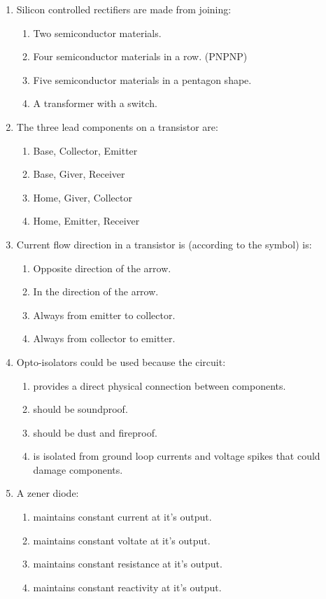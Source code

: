\documentclass[10pt]{article}
\begin{document}
\begin{multicols}{2}
\begin{enumerate}
\begin{enumerate}
	\end{enumerate}
\item Silicon controlled rectifiers are made from joining:
	\begin{enumerate}
	\item Two semiconductor materials.
	\item Four semiconductor materials in a row. (PNPNP)
	\item Five semiconductor materials in a pentagon shape.
	\item A transformer with a switch.
	\end{enumerate}
\item The three lead components on a transistor are:
	\begin{enumerate}
	\item Base, Collector, Emitter
	\item Base, Giver, Receiver
	\item Home, Giver, Collector
	\item Home, Emitter, Receiver
	\end{enumerate}
\item Current flow direction in a transistor is (according to the symbol) is:
	\begin{enumerate}
	\item Opposite direction of the arrow.
	\item In the direction of the arrow.
	\item Always from emitter to collector.
	\item Always from collector to emitter.
	\end{enumerate}
\item Opto-isolators could be used because the circuit:
	\begin{enumerate}
	\item provides a direct physical connection between components.
	\item should be soundproof.
	\item should be dust and fireproof.
	\item is isolated from ground loop currents and voltage spikes that could damage components.
	\end{enumerate}
\item A zener diode:
	\begin{enumerate}
	\item maintains constant current at it's output.
	\item maintains constant voltate at it's output.
	\item maintains constant resistance at it's output.
	\item maintains constant reactivity at it's output.
	\end{enumerate}
\end{enumerate}
\end{multicols}
\end{document}
